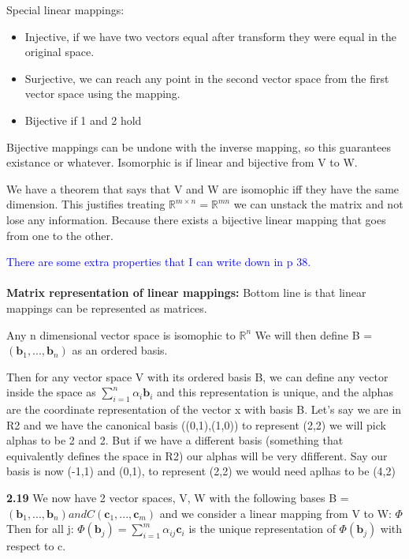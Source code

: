 \documentclass{article}
\newcommand{\tblue}[1]{\textcolor{blue}{#1}}
\begin{document}
Special linear mappings:
\begin{itemize}
    \item Injective, if we have two vectors equal after transform they were equal in the original space.
    \item Surjective, we can reach any point in the second vector space from the first vector space using the mapping.
    \item Bijective if 1 and 2 hold
\end{itemize}
Bijective mappings can be undone with the inverse mapping, so this guarantees existance or whatever.
Isomorphic is if linear and bijective from V to W. 

We have a theorem that says that V and W are isomophic iff they have the same dimension.
This justifies treating $\mathbb{R}^{m \times n} = \mathbb{R}^{mn} $ we can unstack the matrix and 
not lose any information. Because there exists a bijective linear mapping that goes from one to the other.

\tblue{There are some extra properties that I can write down in p 38.}
\\
\\
\textbf{Matrix representation of linear mappings:}
Bottom line is that linear mappings can be represented as matrices.


Any n dimensional vector space is isomophic to $\mathbb{R}^n$ 
We will then define B = $(\textbf{b}_1,...,\textbf{b}_n)$ as an ordered basis.

Then for any vector space V with its ordered basis B, we can define any vector inside the space
as $\sum_{i=1}^{n}\alpha_i \textbf{b}_i$ and this representation is unique, and the alphas are 
the coordinate representation of the vector x with basis B.
Let's say we are in R2 and we have the canonical basis ((0,1),(1,0)) to represent (2,2) we will pick alphas to be 2 and 2.
But if we have a different basis (something that equivalently defines the space in R2) our alphas will be very dfifferent. Say our basis 
is now (-1,1) and (0,1), to represent (2,2) we would need aplhas to be (4,2)

\textbf{2.19}
We now have 2 vector spaces, V, W with the following bases B = $(\textbf{b}_1,...,\textbf{b}_n) and C (\textbf{c}_1,...,\textbf{c}_m)$
and we consider a linear mapping from V to W: $\Phi$
Then for all j: $ \Phi(\textbf{b}_j) = \sum_{i=1}^{m} \alpha_{ij}\textbf{c}_i$ 
is the unique representation of $\Phi(\textbf{b}_j)$ with respect to c.
\end{document}
